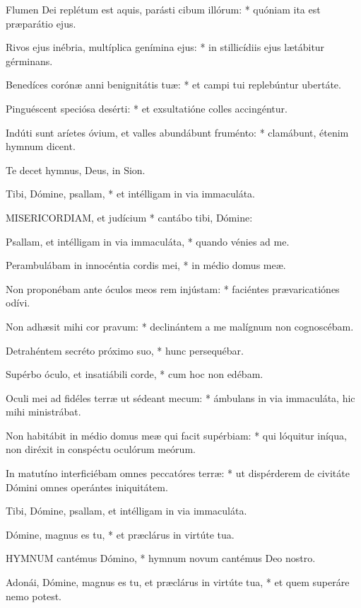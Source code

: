 Flumen Dei replétum est aquis, parásti cibum illórum: * quóniam ita est præparátio ejus.

Rivos ejus inébria, multíplica genímina ejus: * in stillicídiis ejus lætábitur gérminans.

Benedíces corónæ anni benignitátis tuæ: * et campi tui replebúntur ubertáte.

Pinguéscent speciósa desérti: * et exsultatióne colles accingéntur.

Indúti sunt aríetes óvium, et valles abundábunt fruménto: * clamábunt, étenim hymnum dicent.

 Te decet hymnus, Deus, in Sion.

 Tibi, Dómine, psallam, * et intélligam in via immaculáta.


\lettrine[lines=2]{M}{ISERICORDIAM}, et judícium * cantábo tibi, Dómine:

Psallam, et intélligam in via immaculáta, * quando vénies ad me.

Perambulábam in innocéntia cordis mei, * in médio domus meæ.

Non proponébam ante óculos meos rem injústam: * faciéntes prævaricatiónes odívi.

Non adhæsit mihi cor pravum: * declinántem a me malígnum non cognoscébam.

Detrahéntem secréto próximo suo, * hunc persequébar.

Supérbo óculo, et insatiábili corde, * cum hoc non edébam.

Oculi mei ad fidéles terræ ut sédeant mecum: * ámbulans in via immaculáta, hic mihi ministrábat.

Non habitábit in médio domus meæ qui facit supérbiam: * qui lóquitur iníqua, non diréxit in conspéctu oculórum meórum.

In matutíno interficiébam omnes peccatóres terræ: * ut dispérderem de civitáte Dómini omnes operántes iniquitátem.

 Tibi, Dómine, psallam, et intélligam in via immaculáta.

 Dómine, magnus es tu, * et præclárus in virtúte tua.


\lettrine[lines=2]{H}{YMNUM} cantémus Dómino, * hymnum novum cantémus Deo nostro.

Adonái, Dómine, magnus es tu, et præclárus in virtúte tua, * et quem superáre nemo potest.

